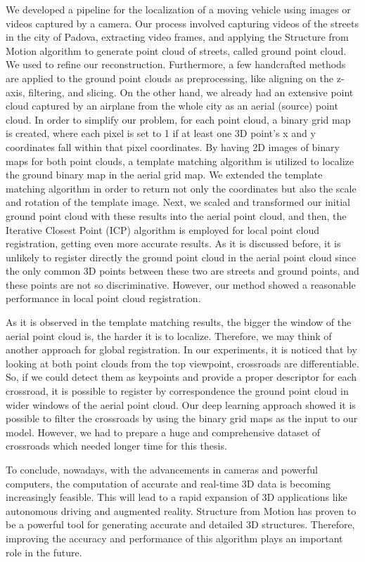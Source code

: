 \documentclass[11pt]{article}
\begin{document}
    We developed a pipeline for the localization of a moving vehicle using images or videos captured by
    a camera. Our process involved capturing videos of the streets in the city of Padova, extracting
    video frames, and applying the Structure from Motion algorithm to generate point cloud of streets, called ground point cloud. We used \cite{lindenberger2021pixsfm}
    to refine our reconstruction. Furthermore, a few handcrafted methods are applied to the ground point clouds as preprocessing, like aligning on the z-axis, filtering, and slicing. On the other hand, we already had an
    extensive point cloud captured by an airplane from the whole city as an aerial (source) point cloud.
    In order to simplify our problem, for each point cloud, a binary grid map is created,
    where each pixel is set to 1 if at least one 3D point's x and y coordinates fall within that pixel coordinates.
    By having 2D images of binary maps for both point clouds, a template matching algorithm is utilized to
    localize the ground binary map in the aerial grid map. We extended the template matching
    algorithm in order to return not only the coordinates but also the scale and rotation of the template image.
    Next, we scaled and transformed our initial ground point cloud with these results into the aerial point cloud, and then, the Iterative Closest Point (ICP) algorithm is employed for local point cloud registration, getting even more accurate results. As it is discussed before, it is unlikely to register directly
    the ground point cloud in the aerial point cloud
    since the only common 3D points between these two are streets and ground points, and these points
    are not so discriminative. However, our method showed a reasonable performance in local point cloud registration.

    As it is observed in the template matching results, the bigger the window of the aerial point cloud is, the harder it is to localize.
    Therefore, we may think of another approach for global registration. In our experiments, it is noticed that by
    looking at both point clouds from the top viewpoint, crossroads are differentiable. So, if we could detect them as keypoints and provide a proper descriptor for each crossroad, it is possible to register by correspondence
    the ground point cloud in wider windows of the aerial point cloud. Our deep learning approach showed it is
    possible to filter the crossroads by using the binary grid maps as the input to our model.
    However, we had to prepare a huge and comprehensive dataset of crossroads which needed longer time for this thesis.

    To conclude, nowadays, with the advancements in cameras and powerful computers, the computation of accurate and
    real-time 3D data is becoming increasingly feasible. This will lead to a rapid expansion of 3D applications like autonomous
    driving and augmented reality. Structure from Motion has proven to be a powerful tool for generating accurate
    and detailed 3D structures. Therefore, improving the accuracy and performance of this algorithm plays an important role in the future.
\end{document}
